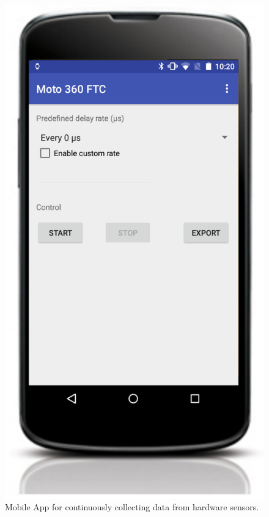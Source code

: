 \documentclass[11pt, draftclsnofoot, onecolumn]{IEEEtran}
\begin{document}
    \begin{figure}[h]	
        \centering
        \includegraphics[scale=0.40]{mobile_app} 
        \caption{Mobile App for continuously collecting data from hardware sensors.}
        \label{fig:mobileapp}
    \end{figure}
    
\end{document}
